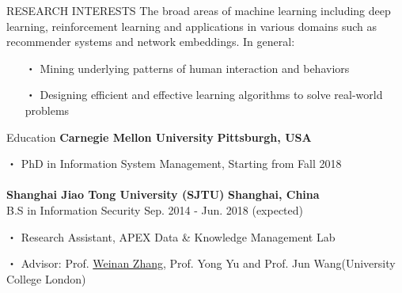 \documentclass{resume} %
\begin{document}
\vspace{-1em}
\begin{rSection}{RESEARCH INTERESTS}
The broad areas of machine learning including deep learning, reinforcement learning and applications in various domains such as recommender systems and network embeddings. In general:
\begin{itemize}[itemindent=-5mm] 
	\itemsep=-5pt
	\vspace*{-5pt}
	\item[・] Mining underlying patterns of human interaction and behaviors
	\item[・] Designing efficient and effective learning algorithms to solve real-world problems
\end{itemize}
\end{rSection}


\begin{rSection}{Education}
\textbf{Carnegie Mellon University} \hfill \textbf{Pittsburgh, USA}
\vspace{-5pt}
\item[・]PhD in Information System Management, Starting from Fall 2018 \\ \\
\textbf{Shanghai Jiao Tong University (SJTU)} \hfill \textbf{Shanghai, China}\\ %
B.S in Information Security \hfill Sep. 2014 - Jun. 2018 (expected)
\vspace{-5pt}
\item[・] Research Assistant, APEX Data \& Knowledge Management Lab
\vspace{-5pt}
\item[・] Advisor: Prof. \href{http://wnzhang.net}{Weinan Zhang}, Prof. Yong Yu and Prof. Jun Wang(University College London)
\end{rSection}
\end{document}
